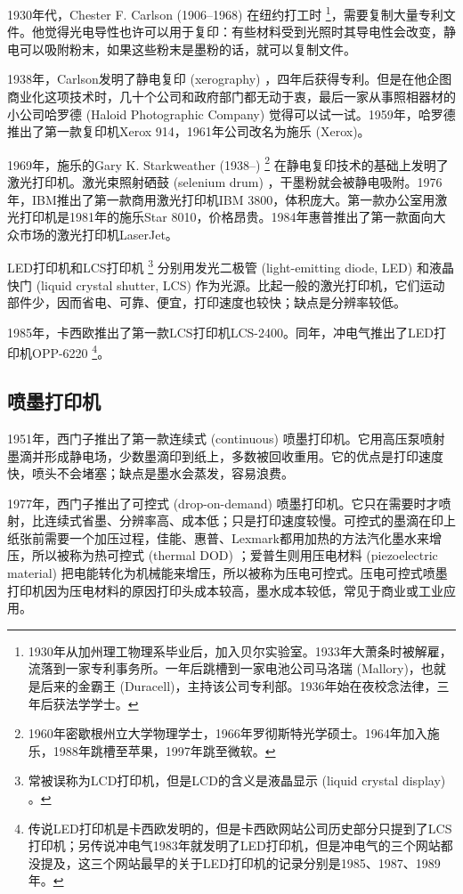 1930年代，Chester F. Carlson (1906--1968)\indexCarlson{} 在纽约打工时 \footnote{1930年从加州理工物理系毕业后，加入贝尔实验室。1933年大萧条时被解雇，流落到一家专利事务所。一年后跳槽到一家电池公司马洛瑞 (Mallory)，也就是后来的金霸王 (Duracell)，主持该公司专利部。1936年始在夜校念法律，三年后获法学学士。}，需要复制大量专利文件。他觉得光电导性也许可以用于复印：有些材料受到光照时其导电性会改变，静电可以吸附粉末，如果这些粉末是墨粉的话，就可以复制文件。

1938年，Carlson发明了静电复印 (xerography) ，四年后获得专利。但是在他企图商业化这项技术时，几十个公司和政府部门都无动于衷，最后一家从事照相器材的小公司哈罗德 (Haloid Photographic Company)\indexHaloid{} 觉得可以试一试。1959年，哈罗德推出了第一款复印机Xerox 914，1961年公司改名为施乐 (Xerox)\indexXerox{}。

1969年，施乐的Gary K. Starkweather (1938--)\indexStarkweather{} \footnote{1960年密歇根州立大学物理学士，1966年罗彻斯特光学硕士。1964年加入施乐，1988年跳槽至苹果，1997年跳至微软。} 在静电复印技术的基础上发明了激光打印机。激光束照射硒鼓 (selenium drum) ，干墨粉就会被静电吸附。1976年，IBM\indexIBM{}推出了第一款商用激光打印机IBM 3800，体积庞大。第一款办公室用激光打印机是1981年的施乐Star 8010，价格昂贵。1984年惠普\indexHP{}推出了第一款面向大众市场的激光打印机LaserJet。

LED打印机和LCS打印机 \footnote{常被误称为LCD打印机，但是LCD的含义是液晶显示 (liquid crystal display) 。} 分别用发光二极管 (light-emitting diode, LED) 和液晶快门 (liquid crystal shutter, LCS) 作为光源。比起一般的激光打印机，它们运动部件少，因而省电、可靠、便宜，打印速度也较快；缺点是分辨率较低。

1985年，卡西欧\indexCasio{}推出了第一款LCS打印机LCS-2400。同年，冲电气\indexOki{}推出了LED打印机OPP-6220 \footnote{传说LED打印机是卡西欧发明的，但是卡西欧网站公司历史部分只提到了LCS打印机；另传说冲电气1983年就发明了LED打印机，但是冲电气的三个网站都没提及，这三个网站最早的关于LED打印机的记录分别是1985、1987、1989年。}。

\subsection{喷墨打印机}

1951年，西门子\indexSiemens{}推出了第一款连续式 (continuous) 喷墨打印机。它用高压泵喷射墨滴并形成静电场，少数墨滴印到纸上，多数被回收重用。它的优点是打印速度快，喷头不会堵塞；缺点是墨水会蒸发，容易浪费。

1977年，西门子推出了可控式 (drop-on-demand) 喷墨打印机。它只在需要时才喷射，比连续式省墨、分辨率高、成本低；只是打印速度较慢。可控式的墨滴在印上纸张前需要一个加压过程，佳能\indexCanon{}、惠普\indexHP{}、Lexmark\indexLexmark{}都用加热的方法汽化墨水来增压，所以被称为热可控式 (thermal DOD) ；爱普生\indexEpson{}则用压电材料 (piezoelectric material) 把电能转化为机械能来增压，所以被称为压电可控式。压电可控式喷墨打印机因为压电材料的原因打印头成本较高，墨水成本较低，常见于商业或工业应用。

